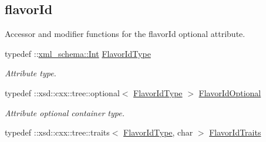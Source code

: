 \subsection*{flavorId}
\label{_amgrpf15481678e23008099784831fbccce30}
Accessor and modifier functions for the flavorId optional attribute. \begin{DoxyCompactItemize}
\item 
\hypertarget{classopenstack_1_1xml_1_1Server_a96ea9f0dc82d7606bcbcb38bf57ef5fb}{
typedef ::\hyperlink{namespacexml__schema_a12d975a13061c938969b2b5143e97645}{xml\_\-schema::Int} \hyperlink{classopenstack_1_1xml_1_1Server_a96ea9f0dc82d7606bcbcb38bf57ef5fb}{FlavorIdType}}
\label{classopenstack_1_1xml_1_1Server_a96ea9f0dc82d7606bcbcb38bf57ef5fb}

\begin{DoxyCompactList}\small\item\em Attribute type. \item\end{DoxyCompactList}\item 
\hypertarget{classopenstack_1_1xml_1_1Server_aa7fd9b502ebf6a05852889833fabe6cf}{
typedef ::xsd::cxx::tree::optional$<$ \hyperlink{classopenstack_1_1xml_1_1Server_a96ea9f0dc82d7606bcbcb38bf57ef5fb}{FlavorIdType} $>$ \hyperlink{classopenstack_1_1xml_1_1Server_aa7fd9b502ebf6a05852889833fabe6cf}{FlavorIdOptional}}
\label{classopenstack_1_1xml_1_1Server_aa7fd9b502ebf6a05852889833fabe6cf}

\begin{DoxyCompactList}\small\item\em Attribute optional container type. \item\end{DoxyCompactList}\item 
\hypertarget{classopenstack_1_1xml_1_1Server_a6a810992aee261582fd7f8e9aaaa9598}{
typedef ::xsd::cxx::tree::traits$<$ \hyperlink{classopenstack_1_1xml_1_1Server_a96ea9f0dc82d7606bcbcb38bf57ef5fb}{FlavorIdType}, char $>$ \hyperlink{classopenstack_1_1xml_1_1Server_a6a810992aee261582fd7f8e9aaaa9598}{FlavorIdTraits}}
\label{classopenstack_1_1xml_1_1Server_a6a810992aee261582fd7f8e9aaaa9598}


\end{DoxyCompactItemize}
